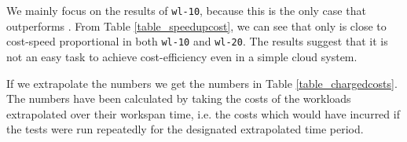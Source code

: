 We mainly focus on the results of \texttt{wl-10}, because this is the
only case that \SE outperforms \STATIC. From Table
\ref{table_speedupcost}, we can see that only \SEfive is close to
cost-speed proportional in both \texttt{wl-10} and \texttt{wl-20}.
The results suggest that it is not an easy task to achieve
cost-efficiency even in a simple cloud system.

If we extrapolate the numbers we get the numbers in Table
\ref{table_chargedcosts}. The numbers have been calculated by taking
the costs of the workloads extrapolated over their workspan time,
i.e. the costs which would have incurred if the tests were run
repeatedly for the designated extrapolated time period.

